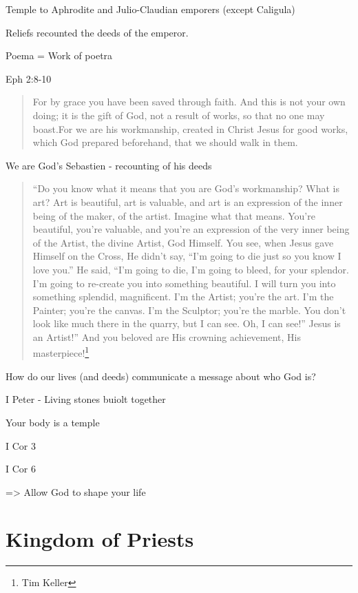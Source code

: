\documentclass[
]{book}
\begin{document}
Temple to Aphrodite and Julio-Claudian emporers (except Caligula)

Reliefs recounted the deeds of the emperor.

Poema = Work of poetra

Eph 2:8-10

\begin{quote}
For by grace you have been saved through faith. And this is not your own doing; it is the gift of God, not a result of works, so that no one may boast.For we are his workmanship, created in Christ Jesus for good works, which God prepared beforehand, that we should walk in them.
\end{quote}

We are God's Sebastien - recounting of his deeds

\begin{quote}
``Do you know what it means that you are God's workmanship? What is art? Art is beautiful, art is valuable, and art is an expression of the inner being of the maker, of the artist. Imagine what that means. You're beautiful, you're valuable, and you're an expression of the very inner being of the Artist, the divine Artist, God Himself. You see, when Jesus gave Himself on the Cross, He didn't say, ``I'm going to die just so you know I love you.'' He said, ``I'm going to die, I'm going to bleed, for your splendor. I'm going to re-create you into something beautiful. I will turn you into something splendid, magnificent. I'm the Artist; you're the art. I'm the Painter; you're the canvas. I'm the Sculptor; you're the marble. You don't look like much there in the quarry, but I can see. Oh, I can see!'' Jesus is an Artist!'' And you beloved are His crowning achievement, His masterpiece!\footnote{Tim Keller}
\end{quote}

How do our lives (and deeds) communicate a message about who God is?

I Peter - Living stones buiolt together

Your body is a temple

I Cor 3

I Cor 6

=\textgreater{} Allow God to shape your life

\hypertarget{kingdom-of-priests}{%
\section{Kingdom of Priests}\label{kingdom-of-priests}}
\end{document}
